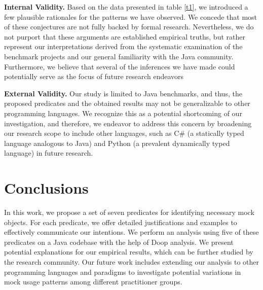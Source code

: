 \documentclass[conference]{IEEEtran}
\begin{document}
\textbf{Internal Validity.}
Based on the data presented in table \ref{t1}, we introduced a few plausible rationales for the patterns we have observed. We concede that most of these conjectures are not fully backed by formal research. Nevertheless, we do not purport that these arguments are established empirical truths, but rather represent our interpretations derived from the systematic examination of the benchmark projects and our general familiarity with the Java community. Furthermore, we believe that several of the inferences we have made could potentially serve as the focus of future research endeavors

\textbf{External Validity.} 
Our study is limited to Java benchmarks, and thus, the proposed predicates and the obtained results may not be generalizable to other programming languages. We recognize this as a potential shortcoming of our investigation, and therefore, we endeavor to address this concern by broadening our research scope to include other languages, such as C\# (a statically typed language analogous to Java) and Python (a prevalent dynamically typed language) in future research.

\section{Conclusions}
In this work, we propose a set of seven predicates for identifying necessary mock objects. For each predicate, we offer detailed justifications and examples to effectively communicate our intentions. We perform an analysis using five of these predicates on a Java codebase with the help of Doop analysis. We present potential explanations for our empirical results, which can be further studied by the research community. Our future work includes extending our analysis to other programming languages and paradigms to investigate potential variations in mock usage patterns among different practitioner groups.



% 

\end{document}
